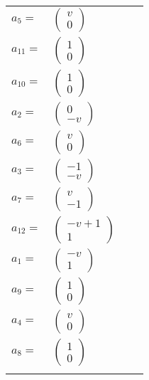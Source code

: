 \documentclass[1p]{elsarticle_modified}
\theoremstyle{definition}
\begin{document}
\begin{tabular}{m{7pt} m{180pt} m{7pt} m{180pt} }
\flushright $a_{5}=$&$\begin{pmatrix}v\\0\end{pmatrix}$ \\
\flushright $a_{11}=$&$\begin{pmatrix}1\\0\end{pmatrix}$ \\
\flushright $a_{10}=$&$\begin{pmatrix}1\\0\end{pmatrix}$ \\
\flushright $a_{2}=$&$\begin{pmatrix}0\\- v\end{pmatrix}$ \\
\flushright $a_{6}=$&$\begin{pmatrix}v\\0\end{pmatrix}$ \\
\flushright $a_{3}=$&$\begin{pmatrix}-1\\- v\end{pmatrix}$ \\
\flushright $a_{7}=$&$\begin{pmatrix}v\\-1\end{pmatrix}$ \\
\flushright $a_{12}=$&$\begin{pmatrix}- v+1\\1\end{pmatrix}$ \\
\flushright $a_{1}=$&$\begin{pmatrix}- v\\1\end{pmatrix}$ \\
\flushright $a_{9}=$&$\begin{pmatrix}1\\0\end{pmatrix}$ \\
\flushright $a_{4}=$&$\begin{pmatrix}v\\0\end{pmatrix}$ \\
\flushright $a_{8}=$&$\begin{pmatrix}1\\0\end{pmatrix}$\\&\end{tabular}
\end{document}
